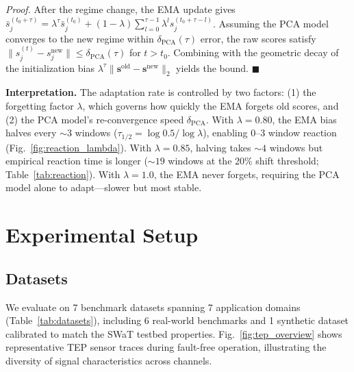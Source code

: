 \documentclass[journal]{IEEEtran}
\renewenvironment{proof}[1][Proof]{\noindent\textit{#1.}\space}{\hfill$\blacksquare$\par\medskip}
\begin{document}
\begin{proof}
After the regime change, the EMA update gives $\bar{s}_j^{(t_0+\tau)} = \lambda^\tau \bar{s}_j^{(t_0)} + (1-\lambda) \sum_{l=0}^{\tau-1} \lambda^l s_j^{(t_0+\tau-l)}$. Assuming the PCA model converges to the new regime within $\delta_{\text{PCA}}(\tau)$ error, the raw scores satisfy $\|s_j^{(t)} - s_j^{\text{new}}\| \leq \delta_{\text{PCA}}(\tau)$ for $t > t_0$. Combining with the geometric decay of the initialization bias $\lambda^\tau \|\mathbf{s}^{\text{old}} - \mathbf{s}^{\text{new}}\|_2$ yields the bound.
\end{proof}

\textbf{Interpretation.} The adaptation rate is controlled by two factors: (1) the forgetting factor $\lambda$, which governs how quickly the EMA forgets old scores, and (2) the PCA model's re-convergence speed $\delta_{\text{PCA}}$. With $\lambda = 0.80$, the EMA bias halves every ${\sim}3$ windows ($\tau_{1/2} = \log 0.5 / \log \lambda$), enabling 0--3 window reaction (Fig.~\ref{fig:reaction_lambda}). With $\lambda = 0.85$, halving takes ${\sim}4$ windows but empirical reaction time is longer (${\sim}19$ windows at the 20\% shift threshold; Table~\ref{tab:reaction}). With $\lambda = 1.0$, the EMA never forgets, requiring the PCA model alone to adapt---slower but most stable.

\section{Experimental Setup}
\label{sec:setup}

\subsection{Datasets}

We evaluate on 7 benchmark datasets spanning 7 application domains (Table~\ref{tab:datasets}), including 6 real-world benchmarks and 1 synthetic dataset calibrated to match the SWaT testbed properties. Fig.~\ref{fig:tep_overview} shows representative TEP sensor traces during fault-free operation, illustrating the diversity of signal characteristics across channels.
\end{document}
